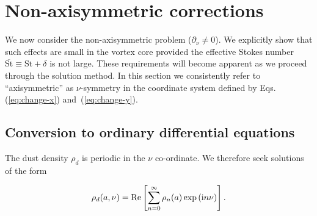 \documentclass[apj]{emulateapj}
\renewcommand{\v}[1]{{\boldsymbol{#1}}} %
\newcommand{\del}{\v{\nabla}}
\newcommand{\grad}{\del}
\newcommand{\Eqs}[2]{Eqs. (\ref{#1}) and~(\ref{#2})}
\newcommand{\eqs}[2]{\Eqs{#1}{#2}}
\newcommand{\Fig}[1]{Fig.~\ref{#1}}
\newcommand{\fig}[1]{\Fig{#1}}
\newcommand{\beq}{\begin{equation}}
\newcommand{\eeq}{\end{equation}}
\begin{document}
%


\section{Non-axisymmetric corrections}
\label{sect:nonaxisymmetric} 

We now consider the non-axisymmetric problem ($\partial_\nu\neq0$). 
We explicitly show that such effects are small 
in the vortex core provided the effective Stokes number $\overline{\mathrm{St}}\equiv\mathrm{St}+\delta$ 
is not large. These requirements will become
apparent as we proceed through the solution method. In this section we
consistently refer to ``axisymmetric'' as $\nu$-symmetry in the coordinate
system defined by \eqs{eq:change-x}{eq:change-y}.

\subsection{Conversion to ordinary differential equations}

The dust density $\rho_d$ is periodic in the $\nu$ co-ordinate. We 
therefore seek solutions of the form

\beq\label{eq:series-n}
\rho_d(a,\nu) = {\rm Re}
\left[\sum_{n=0}^\infty\rho_n(a)\exp{\left(\mathrm{i}n\nu\right)} \right].
\eeq
\end{document}
